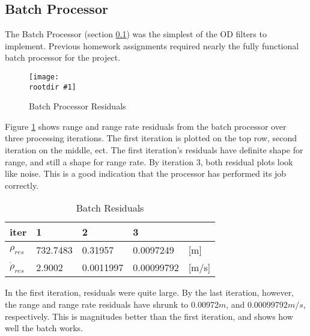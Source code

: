 \documentclass[12pt,a4paper,oneside]{article}
\numberwithin{equation}{section}   		%
\newcommand{\rootdir}{./Figures/}
\newcommand{\fig}[3]{
			\begin{figure}
				\centering
				\texttt{[image: \\rootdir \#1]}
				\caption{#2}
				\label{#3}
			\end{figure}
			}
\begin{document}
\subsection{Batch Processor}
\label{sec:Batch Processor}
The Batch Processor (section \ref{sec:Batch Processor}) was the simplest of the OD filters to implement. Previous homework assignments required nearly the fully functional batch processor for the project. 

\fig{BatchFullRes.eps}{Batch Processor Residuals}{fig:Batch RMS}

Figure \ref{fig:Batch RMS} shows range and range rate residuals from the batch processor over three processing iterations. The first iteration is plotted on the top row, second iteration on the middle, ect. The first iteration's residuals have definite shape for range, and still a shape for range rate. By iteration 3, both residual plots look like noise. This is a good indication that the processor has performed its job correctly. 

\begin{table}[H]
\centering
	\begin{tabular}{|l|l|l|l|l|}
		\hline
		iter&1&2&3& \\\hline
		$\rho_{res}$		&	732.7483	&	0.31957		&	0.0097249	& [m]		\\\hline
		$\dot{\rho}_{res}$	&	2.9002	&	0.0011997	&	0.00099792	& [m/s] 	\\\hline
	\end{tabular}
	\caption{Batch Residuals}
	\label{tab:Batch Res}
\end{table}


In the first iteration, residuals were quite large. By the last iteration, however, the range and range rate residuals have shrunk to 0.00972$m$, and 0.00099792$m/s$, respectively. This is magnitudes better than the first iteration, and shows how well the batch works. 
\end{document}
